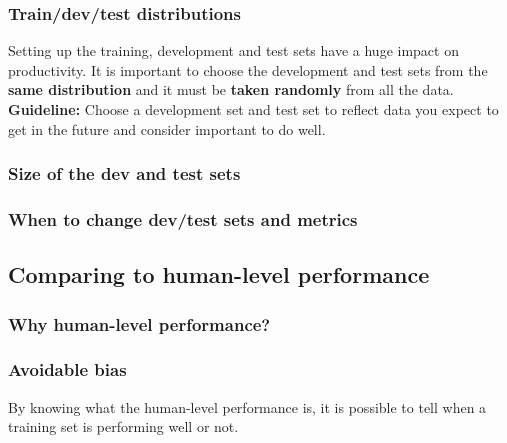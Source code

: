 \subsubsection{Train/dev/test distributions} Setting up the training, development and test sets have a huge impact on productivity. It is important to choose the development and test sets from the \textbf{same distribution} and it must be \textbf{taken randomly} from all the data.
\textbf{Guideline:} Choose a development set and test set to reflect data you expect to get in the future and consider important to do well.

\subsubsection{Size of the dev and test sets} 

\subsubsection{When to change dev/test sets and metrics}

\subsection{Comparing to human-level performance}
\subsubsection{Why human-level performance?}

\subsubsection{Avoidable bias} By knowing what the human-level performance is, it is possible to tell when a training set is performing well or not.

